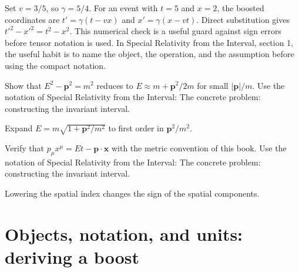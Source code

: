 \begin{example}
Set \(v=3/5\), so \(\gamma=5/4\).  For an event with \(t=5\) and \(x=2\), the boosted coordinates are \(t'=\gamma(t-vx)\) and \(x'=\gamma(x-vt)\).  Direct substitution gives \(t'^2-x'^2=t^2-x^2\).  This numerical check is a useful guard against sign errors before tensor notation is used.  In Special Relativity from the Interval, section 1, the useful habit is to name the object, the operation, and the assumption before using the compact notation.
\end{example}



\begin{exercise}
Show that \(E^2-\bm p^2=m^2\) reduces to \(E\approx m+\bm p^2/2m\) for small \(|\bm p|/m\).  Use the notation of Special Relativity from the Interval: The concrete problem: constructing the invariant interval.
\begin{answer}
Expand \(E=m\sqrt{1+\bm p^2/m^2}\) to first order in \(\bm p^2/m^2\).
\end{answer}
\end{exercise}

\begin{exercise}
Verify that \(p_\mu x^\mu=Et-\bm p\cdot\bm x\) with the metric convention of this book.  Use the notation of Special Relativity from the Interval: The concrete problem: constructing the invariant interval.
\begin{answer}
Lowering the spatial index changes the sign of the spatial components.
\end{answer}
\end{exercise}



\section{Objects, notation, and units: deriving a boost}













